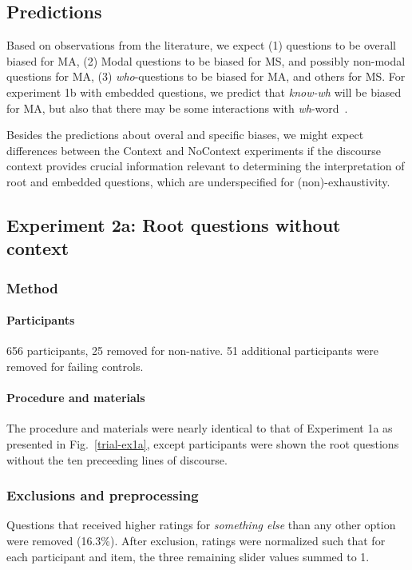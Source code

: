 \documentclass[12pt,letterpaper,table,svgnames,dvipsnames]{article}
\newcommand{\figref}[1]{Fig.~\ref{#1}}
\newcommand{\whw}{\emph{wh}-word~}
\begin{document}
\subsection{Predictions}

Based on observations from the literature, we expect (1) questions to be overall biased for MA, (2) Modal questions to be biased for MS, and possibly non-modal questions for MA, (3) \emph{who}-questions to be biased for MA, and others for MS. For experiment 1b with embedded questions, we predict that \emph{know-wh} will be biased for MA, but also that there may be some interactions with \whw.

Besides the predictions about overal and specific biases, we might expect differences between the Context and NoContext experiments if the discourse context provides crucial information relevant to determining the interpretation of root and embedded questions, which are underspecified for (non)-exhaustivity.

\subsection{Experiment 2a: Root questions without context}


\subsubsection{Method}

\paragraph{Participants}
656 participants, 25 removed for non-native. 51 additional participants were removed for failing controls.

\paragraph{Procedure and materials}
The procedure and materials were nearly identical to that of Experiment 1a as presented in \figref{trial-ex1a}, except participants were shown the root questions without the ten preceeding lines of discourse.


\subsubsection{Exclusions and preprocessing}
Questions that received higher ratings for \emph{something else} than any other option were removed (16.3\%). After exclusion, ratings were normalized such that for each participant and item, the three remaining slider values summed to 1.
\end{document}
